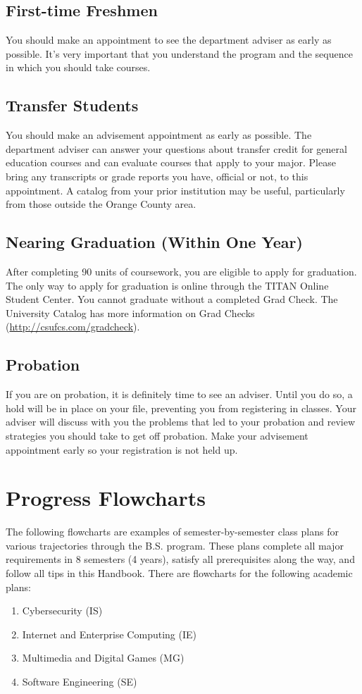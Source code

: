 \documentclass{book}
\newcommand{\IeTrackName}{Internet and Enterprise Computing (IE)}
\newcommand{\IsTrackName}{Cybersecurity (IS)}
\newcommand{\MgTrackName}{Multimedia and Digital Games (MG)}
\newcommand{\SeTrackName}{Software Engineering (SE)}
\newcommand{\shrunkurl}[1]{\url{http://csufcs.com/#1}}
\begin{document}
\section{First-time Freshmen}
You should make an appointment to see the department adviser as early as possible. It's very important that you understand the program and the sequence in which you should take courses.

\section{Transfer Students}
You should make an advisement appointment as early as possible. The department adviser can answer your questions about transfer credit for general education courses and can evaluate courses that apply to your major. Please bring any transcripts or grade reports you have, official or not, to this appointment. A catalog from your prior institution may be useful, particularly from those outside the Orange County area.

\section{Nearing Graduation (Within One Year)}
After completing 90 units of coursework, you are eligible to apply for graduation. The only way to apply for graduation is online through the TITAN Online Student Center. You cannot graduate without a completed Grad Check.  The University Catalog has more information on Grad Checks (\shrunkurl{gradcheck}).

\section{Probation}
If you are on probation, it is definitely time to see an adviser. Until you do so, a hold will be in place on your file, preventing you from registering in classes. Your adviser will discuss with you the problems that led to your probation and review strategies you should take to get off probation. Make your advisement appointment early so your registration is not held up.

\chapter{Progress Flowcharts}

The following flowcharts are examples of semester-by-semester class plans for various trajectories through the B.S. program. These plans complete all major requirements in 8 semesters (4 years), satisfy all prerequisites along the way, and follow all tips in this Handbook. There are flowcharts for the following academic plans:
\begin{enumerate}
\item \IsTrackName
\item \IeTrackName
\item \MgTrackName
\item \SeTrackName
\end{enumerate}
\end{document}
